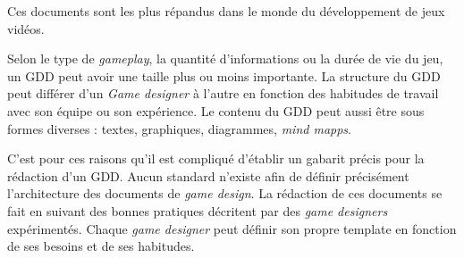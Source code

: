 %  
Ces documents sont les plus répandus dans le monde du développement de jeux vidéos. 

Selon le type de \emph{gameplay}, la quantité d'informations ou la durée de vie du jeu, un GDD peut avoir une taille plus ou moins importante. 
%
La structure du GDD peut différer d'un \emph{Game designer} à l'autre en fonction des habitudes de travail avec son équipe ou son expérience.
Le contenu du GDD peut aussi être sous formes diverses :  textes,  graphiques, diagrammes,  \emph{mind mapps}. 



C'est pour ces raisons qu'il est compliqué d'établir un gabarit précis pour la rédaction d'un GDD.
Aucun standard n'existe afin de définir précisément l'architecture des documents de \emph{game design}.
La rédaction de ces documents se fait en suivant des bonnes pratiques décritent par des \emph{game designers} expérimentés.
Chaque \emph{game designer} peut définir son propre template en fonction de ses besoins et de ses habitudes.